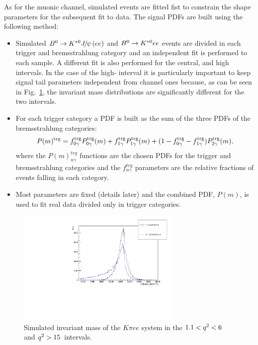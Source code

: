 As for the muonic channel, simulated events are fitted fist to constrain
the shape parameters for the subsequent fit to data. The signal PDFs are built using the following method:
%
\begin{itemize}
\item Simulated $\Bz\to\Kstarz\jpsi(ee)$ and ${{B}^0}\rightarrow{\ensuremath{{K}^{*0}}} ee$ events are divided
in each trigger and bremsstrahlung category and an independent fit is performed to each sample.
A different fit is also performed for the central, \jpsi and high \qsq intervals. In the case of the high-\qsq 
interval it is particularly important to keep signal tail parameters independent from \jpsi channel ones
because, as can be seen in Fig.~\ref{fig:high_central_mass_comparison}, the invariant mass
distributions are significantly different for the two intervals.
\item For each trigger category a PDF is built as the sum of the three PDFs of the bremsstrahlung categories:
\begin{equation}
P(m)^{\rm trg} = f^{\rm trg}_{0\gamma} P^{\rm trg}_{0\gamma}(m) + f^{\rm trg}_{1\gamma} P^{\rm trg}_{1\gamma}(m) + (1 - f^{\rm trg}_{0\gamma} - f^{\rm trg}_{1\gamma}) P^{\rm trg}_{2\gamma}(m),
\end{equation}
where the $P(m)^{trg}_{n\gamma}$ functions are the chosen PDFs for the trigger and bremsstrahlung categories
and the $f^{trg}_{n\gamma}$ parameters are the relative fractions of events falling in each category.
\item Most parameters are fixed (details later) and the combined PDF, $P(m)$,
is used to fit real data divided only in trigger categories.
\end{itemize}
%
\begin{figure}[h!]
\centering
\includegraphics[width=0.70\textwidth]{RKst/figs/high_central_mass_comparison.pdf}
\caption{Simulated invariant mass of the $K\pi ee$ system in the $1.1 < {q^2} < 6$ and ${q^2} > 15$~\gevgevcccc intervals.  }
\label{fig:high_central_mass_comparison}
\end{figure}

